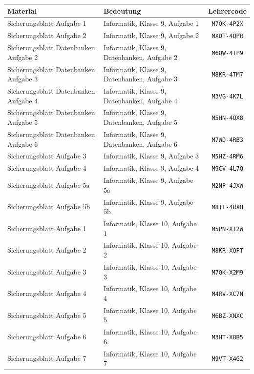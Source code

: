 \documentclass[10pt,a4paper]{article}
\begin{document}
\begin{center}
\begin{tabular}{l l c}
\toprule
Material & Bedeutung & Lehrercode \\
\midrule
Sicherungsblatt Aufgabe 1 & Informatik, Klasse 9, Aufgabe 1 &
\texttt{M7QK-4P2X} \\
Sicherungsblatt Aufgabe 2 & Informatik, Klasse 9, Aufgabe 2 &
\texttt{MXDT-4QPR} \\
Sicherungsblatt Datenbanken Aufgabe 2 & Informatik, Klasse 9, Datenbanken, Aufgabe 2 &
\texttt{M6QW-4TP9} \\
Sicherungsblatt Datenbanken Aufgabe 3 & Informatik, Klasse 9, Datenbanken, Aufgabe 3 &
\texttt{M8KR-4TM7} \\
Sicherungsblatt Datenbanken Aufgabe 4 & Informatik, Klasse 9, Datenbanken, Aufgabe 4 &
\texttt{M3VG-4K7L} \\
Sicherungsblatt Datenbanken Aufgabe 5 & Informatik, Klasse 9, Datenbanken, Aufgabe 5 &
\texttt{M5HN-4QX8} \\
Sicherungsblatt Datenbanken Aufgabe 6 & Informatik, Klasse 9, Datenbanken, Aufgabe 6 &
\texttt{M7WD-4RB3} \\
Sicherungsblatt Aufgabe 3 & Informatik, Klasse 9, Aufgabe 3 &
\texttt{M5HZ-4RM6} \\
Sicherungsblatt Aufgabe 4 & Informatik, Klasse 9, Aufgabe 4 &
\texttt{M9CV-4L7Q} \\
Sicherungsblatt Aufgabe 5a & Informatik, Klasse 9, Aufgabe 5a &
\texttt{M2NP-4JXW} \\
Sicherungsblatt Aufgabe 5b & Informatik, Klasse 9, Aufgabe 5b &
\texttt{M8TF-4RXH} \\
Sicherungsblatt Aufgabe 1 & Informatik, Klasse 10, Aufgabe 1 &
\texttt{M5PN-XT2W} \\
Sicherungsblatt Aufgabe 2 & Informatik, Klasse 10, Aufgabe 2 &
\texttt{M8KR-XQPT} \\
Sicherungsblatt Aufgabe 3 & Informatik, Klasse 10, Aufgabe 3 &
\texttt{M7QK-X2M9} \\
Sicherungsblatt Aufgabe 4 & Informatik, Klasse 10, Aufgabe 4 &
\texttt{M4RV-XC7N} \\
Sicherungsblatt Aufgabe 5 & Informatik, Klasse 10, Aufgabe 5 &
\texttt{M6BZ-XNXC} \\
Sicherungsblatt Aufgabe 6 & Informatik, Klasse 10, Aufgabe 6 &
\texttt{M3HT-X8B5} \\
Sicherungsblatt Aufgabe 7 & Informatik, Klasse 10, Aufgabe 7 &
\texttt{M9VT-X4G2} \\

\end{tabular}
\end{center}
\end{document}
